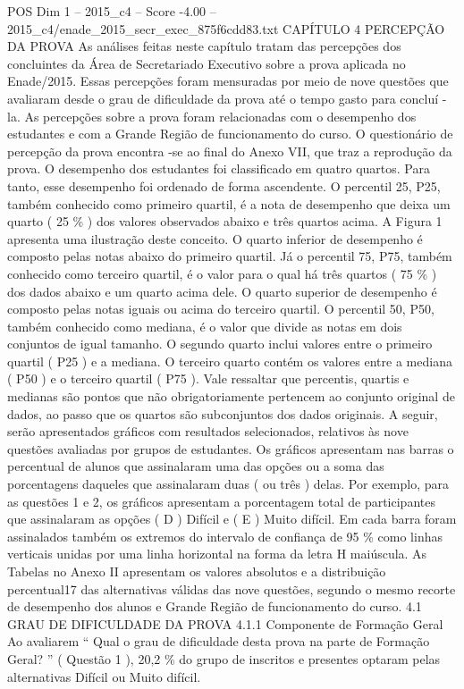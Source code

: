 \begin{textsample}{POS Dim 1 – 2015\_c4 – Score -4.00 – 2015\_c4/enade\_2015\_secr\_exec\_875f6cdd83.txt}  \label{ex:f1_pos_337}
CAPÍTULO 4 PERCEPÇÃO DA PROVA As análises feitas neste capítulo tratam das percepções dos concluintes da Área de Secretariado Executivo sobre a prova aplicada no Enade/2015.
Essas percepções foram mensuradas por meio de nove questões que avaliaram desde o grau de dificuldade da prova até o tempo gasto para concluí -la.
As percepções sobre a prova foram relacionadas com o desempenho dos estudantes e com a Grande Região de funcionamento do curso.
O questionário de percepção da prova encontra -se ao final do Anexo VII, que traz a reprodução da prova.
O desempenho dos estudantes foi classificado em quatro quartos.
Para tanto, esse desempenho foi ordenado de forma ascendente.
O percentil 25, P25, também conhecido como primeiro quartil, é a nota de desempenho que deixa um quarto ( 25 \% ) dos valores observados abaixo e três quartos acima.
A Figura 1 apresenta uma ilustração deste conceito.
O quarto inferior de desempenho é composto pelas notas abaixo do primeiro quartil.
Já o percentil 75, P75, também conhecido como terceiro quartil, é o valor para o qual há três quartos ( 75 \% ) dos dados abaixo e um quarto acima dele.
O quarto superior de desempenho é composto pelas notas iguais ou acima do terceiro quartil.
O percentil 50, P50, também conhecido como mediana, é o valor que divide as notas em dois conjuntos de igual tamanho.
O segundo quarto inclui valores entre o primeiro quartil ( P25 ) e a mediana.
O terceiro quarto contém os valores entre a mediana ( P50 ) e o terceiro quartil ( P75 ).
Vale ressaltar que percentis, quartis e medianas são pontos que não obrigatoriamente pertencem ao conjunto original de dados, ao passo que os quartos são subconjuntos dos dados originais.
A seguir, serão apresentados gráficos com resultados selecionados, relativos às nove questões avaliadas por grupos de estudantes.
Os gráficos apresentam nas barras o percentual de alunos que assinalaram uma das opções ou a soma das porcentagens daqueles que assinalaram duas ( ou três ) delas.
Por exemplo, para as questões 1 e 2, os gráficos apresentam a porcentagem total de participantes que assinalaram as opções ( D ) Difícil e ( E ) Muito difícil.
Em cada barra foram assinalados também os extremos do intervalo de confiança de 95 \% como linhas verticais unidas por uma linha horizontal na forma da letra H maiúscula.
As Tabelas no Anexo II apresentam os valores absolutos e a distribuição percentual17 das alternativas válidas das nove questões, segundo o mesmo recorte de desempenho dos alunos e Grande Região de funcionamento do curso. 4.1 GRAU DE DIFICULDADE DA PROVA 4.1.1 Componente de Formação Geral Ao avaliarem “ Qual o grau de dificuldade desta prova na parte de Formação Geral? ” ( Questão 1 ), 20,2 \% do grupo de inscritos e presentes optaram pelas alternativas Difícil ou Muito difícil.

\end{textsample}
